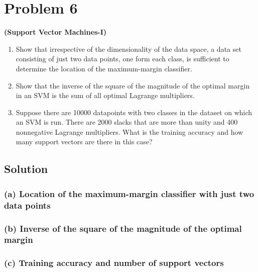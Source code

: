 \section*{Problem 6}

\textbf{(Support Vector Machines-I)}\\
\begin{enumerate}[label= (\alph*), noitemsep, topsep=0pt]
    \item Show that irrespective of the dimensionality of the data space, a data set consisting of just two data points, one form each class, is sufficient to determine the location of the maximum-margin classifier.

    \item Show that the inverse of the square of the magnitude of the optimal margin in an SVM is the sum of all optimal Lagrange multipliers.

    \item Suppose there are 10000 datapoints with two classes in the dataset on which an SVM is run. There are 2000 slacks that are more than unity and 400 nonnegative Lagrange multipliers. What is the training accuracy and how many support vectors are there in this case?
\end{enumerate}

\subsection*{Solution}

\subsubsection*{(a) Location of the maximum-margin classifier with just two data points}

\subsubsection*{(b) Inverse of the square of the magnitude of the optimal margin}

\subsubsection*{(c) Training accuracy and number of support vectors}
